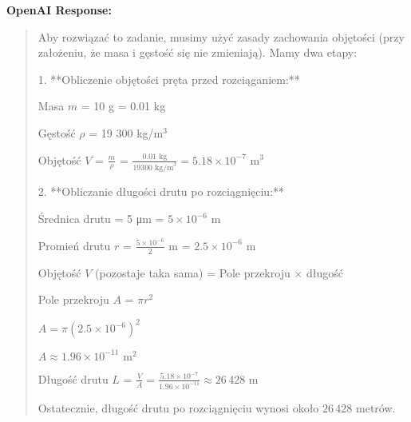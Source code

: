 \documentclass{article}
\begin{document}
    \textbf{OpenAI Response:}

    \begin{quote}
    Aby rozwiązać to zadanie, musimy użyć zasady zachowania objętości (przy założeniu, że masa i gęstość się nie zmieniają). Mamy dwa etapy:

1. **Obliczenie objętości pręta przed rozciąganiem:**

Masa \( m \) = 10 g = 0.01 kg

Gęstość \( \rho \) = 19 300 kg/m\(^3\)

Objętość \( V \) = \(\frac{m}{\rho}\) = \(\frac{0.01 \text{ kg}}{19 300 \text{ kg/m}^3} = 5.18 \times 10^{-7} \text{ m}^3\)

2. **Obliczanie długości drutu po rozciągnięciu:**

Średnica drutu = 5 μm = \(5 \times 10^{-6}\) m

Promień drutu \( r \) = \(\frac{5 \times 10^{-6}}{2}\) m = \(2.5 \times 10^{-6}\) m

Objętość \( V \) (pozostaje taka sama) = Pole przekroju × długość

Pole przekroju \( A \) = \(\pi r^2\)

\( A = \pi (2.5 \times 10^{-6})^2 \)

\( A \approx 1.96 \times 10^{-11} \text{ m}^2\)

Długość drutu \( L \) = \(\frac{V}{A} = \frac{5.18 \times 10^{-7}}{1.96 \times 10^{-11}} \approx 26\,428 \text{ m}\)

Ostatecznie, długość drutu po rozciągnięciu wynosi około \(26\,428\) metrów.
    \end{quote}

    
\end{document}
